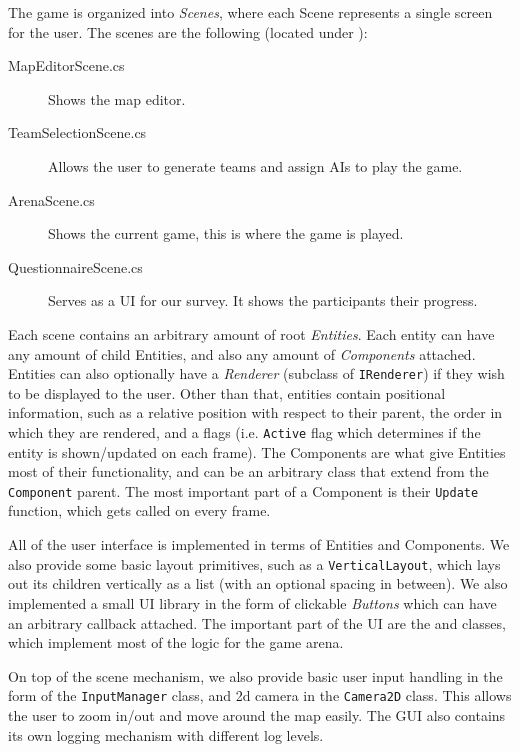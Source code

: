 The game is organized into \emph{Scenes}, where each Scene represents a single screen for the user. The scenes are the following (located under ):

\begin{description}
	\item[MapEditorScene.cs] Shows the map editor.
	\item[TeamSelectionScene.cs] Allows the user to generate teams and assign AIs to play the game.
	\item[ArenaScene.cs] Shows the current game, this is where the game is played.
	\item[QuestionnaireScene.cs] Serves as a UI for our survey. It shows the participants their progress.
\end{description}

Each scene contains an arbitrary amount of root \emph{Entities}. Each entity can have any amount of child Entities, and also any amount of \emph{Components} attached. Entities can also optionally have a \emph{Renderer} (subclass of \verb|IRenderer|) if they wish to be displayed to the user. Other than that, entities contain positional information, such as a relative position with respect to their parent, the order in which they are rendered, and a flags (i.e. \verb|Active| flag which determines if the entity is shown/updated on each frame). The Components are what give Entities most of their functionality, and can be an arbitrary class that extend from the \verb|Component| parent. The most important part of a Component is their \verb|Update| function, which gets called on every frame.

All of the user interface is implemented in terms of Entities and Components. We also provide some basic layout primitives, such as a \verb|VerticalLayout|, which lays out its children vertically as a list (with an optional spacing in between). We also implemented a small UI library in the form of clickable \emph{Buttons} which can have an arbitrary callback attached. The important part of the UI are the  and  classes, which implement most of the logic for the game arena.

On top of the scene mechanism, we also provide basic user input handling in the form of the \verb|InputManager| class, and 2d camera in the \verb|Camera2D| class. This allows the user to zoom in/out and move around the map easily. The GUI also contains its own logging mechanism with different log levels.

